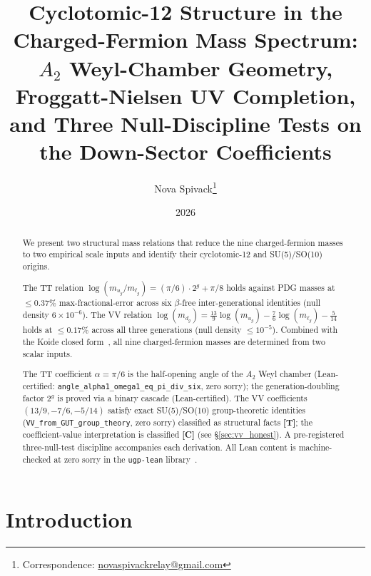 \documentclass[11pt]{article}
\title{\bfseries Cyclotomic-12 Structure in the Charged-Fermion Mass Spectrum:\\
$A_2$ Weyl-Chamber Geometry, Froggatt-Nielsen UV Completion,\\
and Three Null-Discipline Tests on the Down-Sector Coefficients}
\author[1]{Nova Spivack\thanks{Correspondence:
  \href{mailto:novaspivackrelay@gmail.com}{novaspivackrelay@gmail.com}}}
\affil[1]{Independent Research}
\date{2026}
\theoremstyle{remark}
\newcommand{\lean}[1]{\texttt{\small#1}}
\begin{document}
\maketitle
\NovaZenodoAfterTitle

\begin{abstract}
We present two structural mass relations that reduce the nine charged-fermion
masses to two empirical scale inputs and identify their cyclotomic-12 and
SU(5)/SO(10) origins.

The TT relation $\log(m_{u_g}/m_{\ell_g}) = (\pi/6)\cdot 2^g + \pi/8$
holds against PDG masses at $\leq 0.37\%$ max-fractional-error across six
$\beta$-free inter-generational identities (null density $6\times10^{-6}$).
The VV relation $\log(m_{d_g}) = \tfrac{13}{9}\log(m_{u_g}) - \tfrac{7}{6}\log(m_{\ell_g}) - \tfrac{5}{14}$
holds at $\leq 0.17\%$ across all three generations (null density $\leq 10^{-5}$).
Combined with the Koide closed form~\cite{Spivack2026_Koide},
all nine charged-fermion masses are determined from two scalar inputs.

The TT coefficient $\alpha = \pi/6$ is the half-opening angle of the $A_2$
Weyl chamber (Lean-certified: \lean{angle\_alpha1\_omega1\_eq\_pi\_div\_six},
zero sorry); the generation-doubling factor $2^g$ is proved via a binary
cascade (Lean-certified).
The VV coefficients $(13/9, -7/6, -5/14)$ satisfy exact SU(5)/SO(10)
group-theoretic identities (\lean{VV\_from\_GUT\_group\_theory}, zero sorry)
classified as structural facts \textbf{[T]}; the coefficient-value
interpretation is classified \textbf{[C]} (see \S\ref{sec:vv_honest}).
A pre-registered three-null-test discipline accompanies each derivation.
All Lean content is machine-checked at zero sorry in the \texttt{ugp-lean}
library~\cite{ugp-lean}.
\end{abstract}

\vspace{2em}
\tableofcontents
\newpage

\section{Introduction}
\label{sec:intro}
\end{document}
